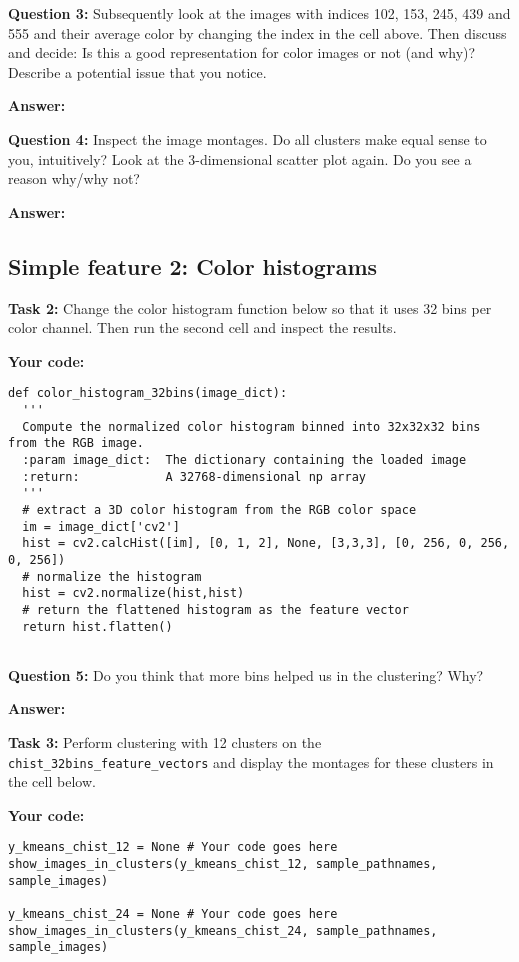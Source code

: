 \documentclass[11pt]{article}
\begin{document}
\noindent\textbf{Question 3:} Subsequently look at the images with indices 102, 153, 245, 439 and 555 and their average color by changing the index in the cell above. Then discuss and decide: Is this a good representation for color images or not (and why)? Describe a potential issue that you notice.

\textbf{Answer:}


\noindent\textbf{Question 4:} Inspect the image montages. Do all clusters make equal sense to you, intuitively? Look at the 3-dimensional scatter plot again. Do you see a reason why/why not?

\textbf{Answer:}


\subsection{Simple feature 2: Color histograms}

\noindent\textbf{Task 2:} Change the color histogram function below so that it uses 32 bins per color channel. Then run the second cell and inspect the results.

\textbf{Your code:}

\begin{lstlisting}
def color_histogram_32bins(image_dict):
  '''
  Compute the normalized color histogram binned into 32x32x32 bins from the RGB image.
  :param image_dict:  The dictionary containing the loaded image
  :return:            A 32768-dimensional np array
  '''
  # extract a 3D color histogram from the RGB color space
  im = image_dict['cv2']
  hist = cv2.calcHist([im], [0, 1, 2], None, [3,3,3], [0, 256, 0, 256, 0, 256])
  # normalize the histogram
  hist = cv2.normalize(hist,hist)
  # return the flattened histogram as the feature vector
  return hist.flatten()
 
\end{lstlisting} 


\noindent\textbf{Question 5:} Do you think that more bins helped us in the clustering? Why?

\textbf{Answer:}


\noindent\textbf{Task 3:} Perform clustering with 12 clusters on the \texttt{chist\_32bins\_feature\_vectors} and display the montages for these clusters in the cell below.

\textbf{Your code:}
\begin{lstlisting}
y_kmeans_chist_12 = None # Your code goes here
show_images_in_clusters(y_kmeans_chist_12, sample_pathnames, sample_images)

y_kmeans_chist_24 = None # Your code goes here
show_images_in_clusters(y_kmeans_chist_24, sample_pathnames, sample_images)
\end{lstlisting}
\end{document}
